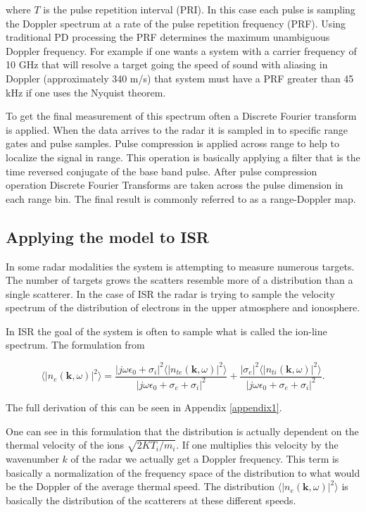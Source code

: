 \noindent where $T$ is the pulse repetition interval (PRI).  In this case each pulse is sampling the Doppler spectrum at a rate of the pulse repetition frequency (PRF).  Using traditional PD processing the PRF determines the maximum unambiguous Doppler frequency.  For example if one wants a system with a carrier frequency of 10 GHz that will resolve a target going the speed of sound with aliasing in Doppler (approximately 340 m/s) that system must have a PRF greater than 45 kHz if one uses the Nyquist theorem.   

To get the final measurement of this spectrum often a Discrete Fourier transform is applied.  When the data arrives to the radar it is sampled in to specific range gates and pulse samples.  Pulse compression is applied across range to help to localize the signal in range.  This operation is basically applying a filter that is the time reversed conjugate of the base band pulse.  After pulse compression operation Discrete Fourier Transforms are taken across the pulse dimension in each range bin.   The final result is commonly referred to as a range-Doppler map.


\subsection{Applying the model to ISR}
In some radar modalities the system is attempting to measure numerous targets.  The number of targets grows the scatters resemble more of a distribution than a single scatterer.  In the case of ISR the radar is trying to sample the velocity spectrum of the distribution of electrons in the upper atmosphere and ionosphere.  

In ISR the goal of the system is often to sample what is called the ion-line spectrum. The formulation from  \cite{kudeki:milla:1,kudeki:milla:2,Kudeki:2006kx}


\begin{equation}
\label{eq:mainspeceq:body}
\langle \left|n_e(\mathbf{k},\omega)\right|^2\rangle = \frac{|j\omega\epsilon_0 + \sigma_i|^2 \langle |n_{te}(\mathbf{k},\omega)|^2\rangle}{|j\omega\epsilon_0 +\sigma_e+\sigma_i|^2} + \frac{| \sigma_e|^2 \langle |n_{ti}(\mathbf{k},\omega)|^2\rangle}{|j\omega\epsilon_0 +\sigma_e+\sigma_i|^2}.
\end{equation}

\noindent The full derivation of this can be seen in Appendix \ref{appendix1}.


One can see in this formulation that the distribution is actually dependent on the thermal velocity of the ions $\sqrt{2KT_i/m_i}$.  If one multiplies this velocity by the wavenumber $k$ of the radar we actually get a Doppler frequency.  This term is basically a normalization of the frequency space of the distribution to what would be the Doppler of the average thermal speed. The distribution $\langle \left|n_e(\mathbf{k},\omega)\right|^2\rangle $ is basically the distribution of the scatterers at these different speeds.

